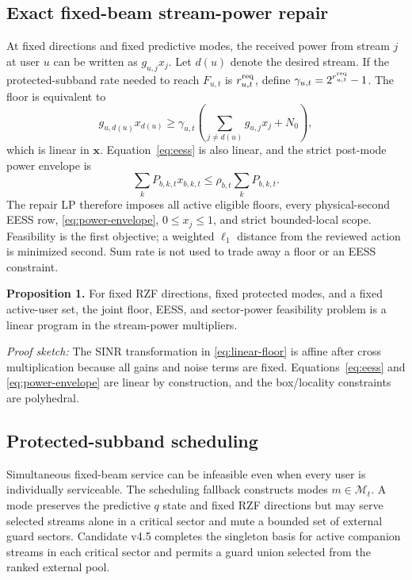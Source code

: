 \documentclass[journal]{IEEEtran}
\newcommand{\M}{\mathcal{M}}
\begin{document}
\subsection{Exact fixed-beam stream-power repair}
At fixed directions and fixed predictive modes, the received power from stream $j$ at user $u$ can be written as $g_{u,j}x_j$. Let $d(u)$ denote the desired stream. If the protected-subband rate needed to reach $F_{u,t}$ is $r^{\rm req}_{u,t}$, define $\gamma_{u,t}=2^{r^{\rm req}_{u,t}}-1$. The floor is equivalent to
\begin{equation}
 g_{u,d(u)}x_{d(u)}
 \ge \gamma_{u,t}\!\left(
 \sum_{j\ne d(u)}g_{u,j}x_j+N_0\right),
 \label{eq:linear-floor}
\end{equation}
which is linear in $\bm x$. Equation~\eqref{eq:eess} is also linear, and the strict post-mode power envelope is
\begin{equation}
 \sum_k P_{b,k,t}x_{b,k,t}\le \rho_{b,t}\sum_k P_{b,k,t}.
 \label{eq:power-envelope}
\end{equation}
The repair LP therefore imposes all active eligible floors, every physical-second EESS row, \eqref{eq:power-envelope}, $0\le x_j\le1$, and strict bounded-local scope. Feasibility is the first objective; a weighted $\ell_1$ distance from the reviewed action is minimized second. Sum rate is not used to trade away a floor or an EESS constraint.

\textbf{Proposition 1.} For fixed RZF directions, fixed protected modes, and a fixed active-user set, the joint floor, EESS, and sector-power feasibility problem is a linear program in the stream-power multipliers.

\emph{Proof sketch:} The SINR transformation in \eqref{eq:linear-floor} is affine after cross multiplication because all gains and noise terms are fixed. Equations~\eqref{eq:eess} and \eqref{eq:power-envelope} are linear by construction, and the box/locality constraints are polyhedral.

\subsection{Protected-subband scheduling}
Simultaneous fixed-beam service can be infeasible even when every user is individually serviceable. The scheduling fallback constructs modes $m\in\M_t$. A mode preserves the predictive $q$ state and fixed RZF directions but may serve selected streams alone in a critical sector and mute a bounded set of external guard sectors. Candidate v4.5 completes the singleton basis for active companion streams in each critical sector and permits a guard union selected from the ranked external pool.
\end{document}
